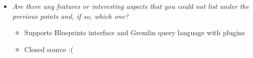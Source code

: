 
\begin{itemize}
\item \emph{Are there any features or interesting aspects that you could not list under the previous points and, if so, which one?}
\begin{itemize}
	\item Supports Blueprints interface and Gremlin query language with plugins
	\item Closed source :(
\end{itemize}
\end{itemize}